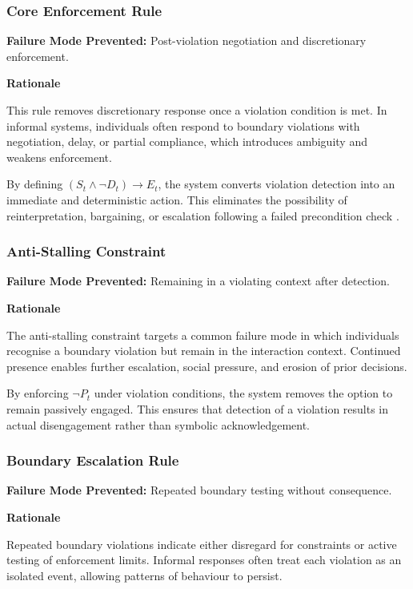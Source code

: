 \documentclass{article}
\begin{document}
	\subsubsection*{Core Enforcement Rule}
	
	\textbf{Failure Mode Prevented:} Post-violation negotiation and discretionary enforcement.
	
	\textbf{Rationale}
	
	This rule removes discretionary response once a violation condition is met. In informal systems, individuals often respond to boundary violations with negotiation, delay, or partial compliance, which introduces ambiguity and weakens enforcement.
	
	By defining $(S_t \land \neg D_t) \rightarrow E_t$, the system converts violation detection into an immediate and deterministic action. This eliminates the possibility of reinterpretation, bargaining, or escalation following a failed precondition check \cite{precondition_failure}.
	
	\subsubsection*{Anti-Stalling Constraint}
	
	\textbf{Failure Mode Prevented:} Remaining in a violating context after detection.
	
	\textbf{Rationale}
	
	The anti-stalling constraint targets a common failure mode in which individuals recognise a boundary violation but remain in the interaction context. Continued presence enables further escalation, social pressure, and erosion of prior decisions.
	
	By enforcing $\neg P_t$ under violation conditions, the system removes the option to remain passively engaged. This ensures that detection of a violation results in actual disengagement rather than symbolic acknowledgement.
	
	\subsubsection*{Boundary Escalation Rule}
	
	\textbf{Failure Mode Prevented:} Repeated boundary testing without consequence.
	
	\textbf{Rationale}
	
	Repeated boundary violations indicate either disregard for constraints or active testing of enforcement limits. Informal responses often treat each violation as an isolated event, allowing patterns of behaviour to persist.
	
\end{document}
